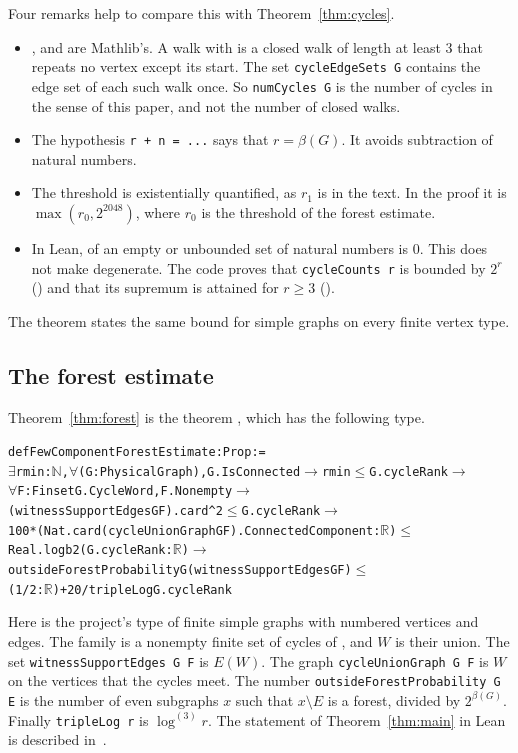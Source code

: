 \documentclass[11pt]{article}
\theoremstyle{definition}
\theoremstyle{remark}
\newcommand{\lgk}[1]{\log^{(#1)}}
\newcommand{\sm}{\setminus}
\numberwithin{equation}{section}
\begin{document}
Four remarks help to compare this with Theorem~\ref{thm:cycles}.
\begin{itemize}
\item {},  and  are Mathlib's. A walk with 
is a closed walk of length at least $3$ that repeats no vertex except its start. The set
\texttt{cycleEdgeSets G} contains the edge set of each such walk once. So \texttt{numCycles G} is the
number of cycles in the sense of this paper, and not the number of closed walks.
\item The hypothesis \texttt{r + n = ...} says that $r=\beta(G)$. It avoids subtraction of natural
numbers.
\item The threshold is existentially quantified, as $r_1$ is in the text. In the proof it is
$\max(r_0,2^{2048})$, where $r_0$ is the threshold of the forest estimate.
\item In Lean,  of an empty or unbounded set of natural numbers is $0$. This does not
make  degenerate. The code proves that \texttt{cycleCounts r} is bounded by $2^{r}$
() and that its supremum is attained for $r\ge3$ ().
\end{itemize}
The theorem  states the same bound for simple graphs on every
finite vertex type.

\subsection{The forest estimate}

Theorem~\ref{thm:forest} is the theorem , which has the
following type.

{\small
\begin{alltt}
def FewComponentForestEstimate : Prop :=
  \(\exists\) rmin : \(\mathbb{N}\), \(\forall\) (G : PhysicalGraph), G.IsConnected \(\to\) rmin \(\le\) G.cycleRank \(\to\)
    \(\forall\) F : Finset G.CycleWord, F.Nonempty \(\to\)
      (witnessSupportEdges G F).card ^ 2 \(\le\) G.cycleRank \(\to\)
      100 * (Nat.card (cycleUnionGraph G F).ConnectedComponent : \(\mathbb{R}\)) \(\le\)
        Real.logb 2 (G.cycleRank : \(\mathbb{R}\)) \(\to\)
      outsideForestProbability G (witnessSupportEdges G F) \(\le\)
        (1 / 2 : \(\mathbb{R}\)) + 20 / tripleLog G.cycleRank
\end{alltt}}

Here  is the project's type of finite simple graphs with numbered vertices and
edges. The family  is a nonempty finite set of cycles of , and $W$ is their union.
The set \texttt{witnessSupportEdges G F} is $E(W)$. The graph \texttt{cycleUnionGraph G F} is $W$ on
the vertices that the cycles meet. The number \texttt{outsideForestProbability G E} is the number of
even subgraphs $x$ such that $x\sm E$ is a forest, divided by $2^{\beta(G)}$. Finally
\texttt{tripleLog r} is $\lgk3r$. The statement of Theorem~\ref{thm:main} in Lean is described
in~\cite[\S1.2]{KNT}.
\end{document}
